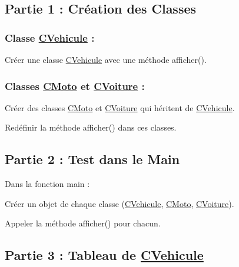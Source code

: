\subsection*{Partie 1 \+: Création des Classes}

\subsubsection*{Classe \hyperlink{classCVehicule}{C\+Vehicule} \+:}


\begin{DoxyItemize}
\item Créer une classe {\ttfamily \hyperlink{classCVehicule}{C\+Vehicule}} avec une méthode {\ttfamily afficher()}.
\end{DoxyItemize}

\subsubsection*{Classes \hyperlink{classCMoto}{C\+Moto} et \hyperlink{classCVoiture}{C\+Voiture} \+:}


\begin{DoxyItemize}
\item Créer des classes {\ttfamily \hyperlink{classCMoto}{C\+Moto}} et {\ttfamily \hyperlink{classCVoiture}{C\+Voiture}} qui héritent de {\ttfamily \hyperlink{classCVehicule}{C\+Vehicule}}.
\item Redéfinir la méthode {\ttfamily afficher()} dans ces classes.
\end{DoxyItemize}

\subsection*{Partie 2 \+: Test dans le Main}

Dans la fonction {\ttfamily main} \+:


\begin{DoxyItemize}
\item Créer un objet de chaque classe ({\ttfamily \hyperlink{classCVehicule}{C\+Vehicule}}, {\ttfamily \hyperlink{classCMoto}{C\+Moto}}, {\ttfamily \hyperlink{classCVoiture}{C\+Voiture}}).
\item Appeler la méthode {\ttfamily afficher()} pour chacun.
\end{DoxyItemize}

\subsection*{Partie 3 \+: Tableau de \hyperlink{classCVehicule}{C\+Vehicule}}


